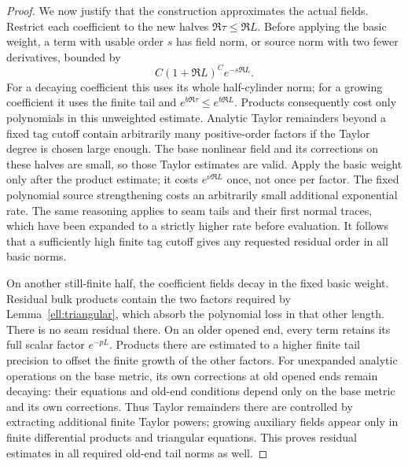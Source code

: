 \begin{proof}
We now justify that the construction approximates the actual
fields.  Restrict each coefficient to the new halves
$\Re\tau\le\Re L$.  Before applying the basic weight, a term
with usable order $s$ has field norm, or source norm with two
fewer derivatives, bounded by
\begin{equation}
            C(1+\Re L)^C e^{-s\Re L}.
 \label{ell:tag-bound}
\end{equation}
For a decaying coefficient this uses its whole half-cylinder
norm; for a growing coefficient it uses the finite tail and
$e^{b\Re\tau}\le e^{b\Re L}$.  Products consequently cost
only polynomials in this unweighted estimate.  Analytic Taylor
remainders beyond a fixed tag cutoff contain arbitrarily many
positive-order factors if the Taylor degree is chosen large
enough.  The base nonlinear field and its corrections on these
halves are small, so those Taylor estimates are valid.
Apply the basic weight only after the product estimate; it
costs $e^{\nu\Re L}$ once, not once per factor.  The fixed
polynomial source strengthening costs an arbitrarily small
additional exponential rate.  The same reasoning applies
to seam tails and their first normal traces, which have been
expanded to a strictly higher rate before evaluation.
It follows that a sufficiently high finite tag cutoff gives
any requested residual order in all basic norms.

On another still-finite half, the coefficient fields decay
in the fixed basic weight.  Residual bulk products contain
the two factors required by Lemma~\ref{ell:triangular},
which absorb the polynomial loss in that other length.
There is no seam residual there.  On an older opened end,
every term retains its full scalar factor $e^{-pL}$.
Products there are estimated to a higher finite tail precision
to offset the finite growth of the other factors.  For
unexpanded analytic operations on the base metric, its own
corrections at old opened ends remain decaying: their equations
and old-end conditions depend only on the base metric and
its own corrections.  Thus Taylor remainders there are
controlled by extracting additional finite Taylor powers;
growing auxiliary fields appear only in finite differential
products and triangular equations.  This proves residual
estimates in all required old-end tail norms as well.


\end{proof}
